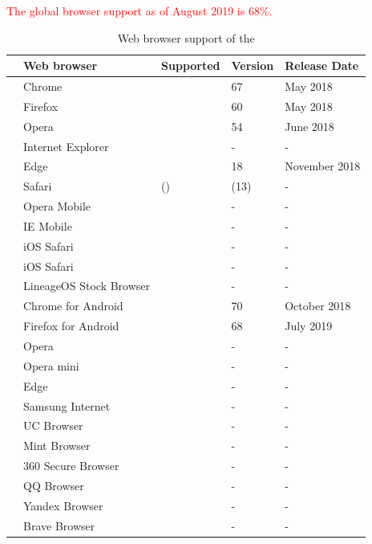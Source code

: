 \textcolor{red}{The global browser support as of August 2019 is 68\%.}
\begin{table}[ht]
\renewcommand\thetable{1}
\begin{tabularx}{\textwidth}{l|p{4.8cm}|p{2cm}|p{2cm}|p{3.3cm}}
	& Web browser & Supported & Version & Release Date \\
	\hline
	\parbox[t]{2mm}{} & Chrome & \OK & 67 & May 2018 \\
	& Firefox & \OK & 60 & May 2018 \\
	& Opera & \OK & 54 & June 2018 \\
	& Internet Explorer & \NOOK & - & - \\
	& Edge & \OK & 18 & November 2018 \\
	& Safari & (\OK) & (13) & - \\
	\hline
	\parbox[t]{2mm}{} & Opera Mobile & \NOOK & - & - \\
	& IE Mobile & \NOOK & - & - \\
	& iOS Safari & \NOOK & - & - \\
	& iOS Safari & \NOOK & - & - \\
	\hline
	\parbox[t]{2mm}{} & LineageOS Stock Browser & \NOOK & - & - \\
	& Chrome for Android & \OK & 70 & October 2018 \\
	& Firefox for Android & \OK & 68 & July 2019 \\
	& Opera & \NOOK & - & - \\
	& Opera mini & \NOOK & - & - \\
	& Edge & \NOOK & - & - \\
	& Samsung Internet & \NOOK & - & - \\
	& UC Browser & \NOOK & - & - \\
	& Mint Browser & \NOOK & - & - \\
	& 360 Secure Browser & \NOOK & - & - \\
	& QQ Browser & \NOOK & - & - \\
	& Yandex Browser & \NOOK & - & - \\
	& Brave Browser & \NOOK & - & -
\end{tabularx}
\caption[Web browser support of the \wa{}]{Web browser support of the \wa{}\footnotemark} \label{tab:browser-support}
\end{table}
\newpage

